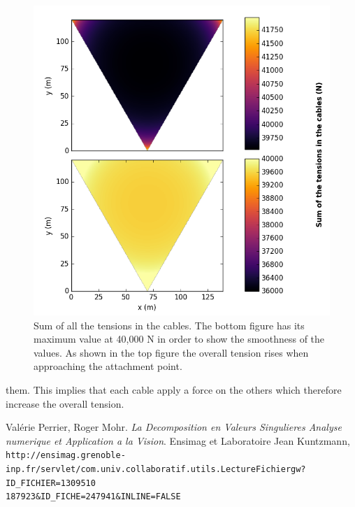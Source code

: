\documentclass[10 pt]{article}
\begin{document}
\begin{multicols}{2}
\begin{figure}[H]
\includegraphics[width = \linewidth]{sum_tension}
\caption{Sum of all the tensions in the cables. The bottom figure has its maximum value at 40,000 N in order to show the smoothness of the values. As shown in the top figure the overall tension rises when approaching the attachment point.} 
\end{figure}

them. This implies that each cable apply a force on the others which therefore increase the overall tension.

\end{multicols}

\begin{thebibliography}{1}
Valérie Perrier, Roger Mohr.
\textit{La Decomposition en Valeurs Singulieres Analyse numerique et Application a la Vision}.
Ensimag et Laboratoire Jean Kuntzmann,
\\\texttt{http://ensimag.grenoble-inp.fr/servlet/com.univ.collaboratif.utils.LectureFichiergw?ID\_FICHIER=1309510\\187923\&ID\_FICHE=247941\&INLINE=FALSE}
\end{thebibliography}
\end{document}
